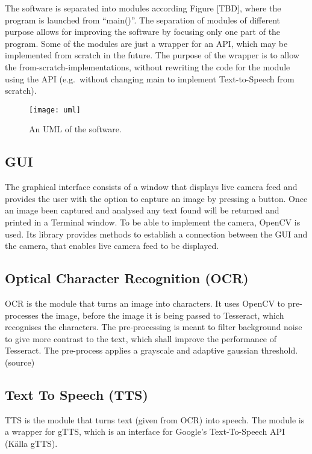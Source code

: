 \documentclass[../main.tex]{subfiles}
\begin{document}
The software is separated into modules according Figure [TBD], where the
program is launched from ``main()''. The separation of modules of different
purpose allows for improving the software by focusing only one part of the
program. Some of the modules are just a wrapper for an API, which may be
implemented from scratch in the future. The purpose of the wrapper is to allow
the from-scratch-implementations, without rewriting the code for the module
using the API (e.g.\ without changing main to implement Text-to-Speech from
scratch).

\begin{figure}[ht!]
  \centering
  \caption{An UML of the software.\label{fig:uml}}
  \texttt{[image: uml]}
\end{figure}

\subsection{GUI}
The graphical interface consists of a window that displays live camera feed and provides the user with the option to capture an image by pressing a button. Once an image been captured and analysed any text found will be returned and printed in a Terminal window. To be able to implement the camera, OpenCV is used. Its library provides methods to establish a connection between the GUI and the camera, that enables live camera feed to be displayed.

\subsection{Optical Character Recognition (OCR)}

OCR is the module that turns an image into characters. It uses OpenCV to pre-processes the image, before the image it is being passed to Tesseract, which recognises the characters. The pre-processing is meant to filter background noise to give more contrast to the text, which shall improve the performance of Tesseract. The pre-process applies a grayscale and adaptive gaussian threshold. (source) %

\subsection{Text To Speech (TTS)}

TTS is the module that turns text (given from OCR) into speech. The module is a wrapper for gTTS, which is an interface for Google’s Text-To-Speech API (Källa gTTS).
\end{document}
